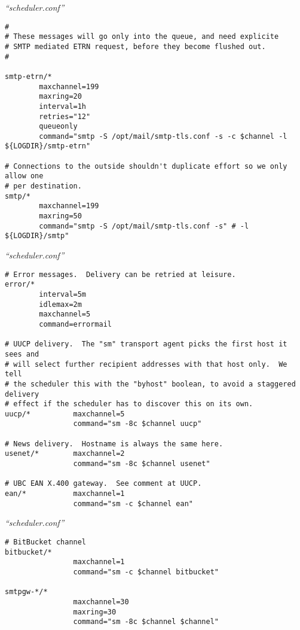 \documentclass[a4paper,landscape]{slides}
\begin{document}
\begin{overlay}
\small
\centerline{{\em ``scheduler.conf''}}
\tiny
\begin{verbatim}
#
# These messages will go only into the queue, and need explicite
# SMTP mediated ETRN request, before they become flushed out.
#

smtp-etrn/*
        maxchannel=199
        maxring=20
        interval=1h
        retries="12"
        queueonly
        command="smtp -S /opt/mail/smtp-tls.conf -s -c $channel -l ${LOGDIR}/smtp-etrn"

# Connections to the outside shouldn't duplicate effort so we only allow one
# per destination.
smtp/*
        maxchannel=199
        maxring=50
        command="smtp -S /opt/mail/smtp-tls.conf -s" # -l ${LOGDIR}/smtp"
\end{verbatim}
\vfill
\end{overlay}
\begin{overlay}
\small
\centerline{{\em ``scheduler.conf''}}
\tiny
\begin{verbatim}
# Error messages.  Delivery can be retried at leisure.
error/*
        interval=5m
        idlemax=2m
        maxchannel=5
        command=errormail

# UUCP delivery.  The "sm" transport agent picks the first host it sees and
# will select further recipient addresses with that host only.  We tell
# the scheduler this with the "byhost" boolean, to avoid a staggered delivery
# effect if the scheduler has to discover this on its own.
uucp/*          maxchannel=5
                command="sm -8c $channel uucp"

# News delivery.  Hostname is always the same here.
usenet/*        maxchannel=2
                command="sm -8c $channel usenet"

# UBC EAN X.400 gateway.  See comment at UUCP.
ean/*           maxchannel=1
                command="sm -c $channel ean"
\end{verbatim}
\vfill
\end{overlay}
\begin{overlay}
\small
\centerline{{\em ``scheduler.conf''}}
\tiny
\begin{verbatim}
# BitBucket channel
bitbucket/*
                maxchannel=1
                command="sm -c $channel bitbucket"

smtpgw-*/*
                maxchannel=30
                maxring=30
                command="sm -8c $channel $channel"
\end{verbatim}
\vfill
\end{overlay}
\end{document}
